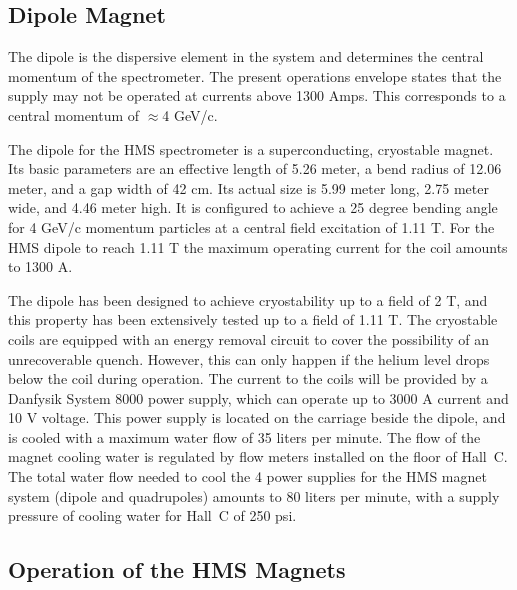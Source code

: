 {\vspace{0.5in}
\hspace*{3.5in}{\underline{~~~~~~~~~~~~~~~~~~~~~~~~~~~~~~~~~}}
\newline
\hspace*{3.5in}{Signature~~~~~~~~~~~~Date}

\newpage
\subsection{Dipole Magnet }

The dipole is the dispersive element in the system and 
determines the central momentum of the spectrometer.
The present operations envelope states that the supply may not be
operated at currents above 1300 Amps. This corresponds to a central
momentum of $\approx$4 GeV/c.

The dipole for the HMS spectrometer is a superconducting, cryostable magnet.
Its basic parameters are an effective length of 5.26 meter,
a bend radius of 12.06 meter, and a gap width of 42 cm.
Its actual size is 5.99 meter long, 2.75 meter wide, and 4.46 meter high.
It is configured to achieve a 25 degree bending angle for 4 GeV/c momentum
particles at a central field excitation of 1.11 T.
For the HMS dipole to reach 1.11 T the maximum operating current for the coil
amounts to 1300 A.

The dipole has been designed to achieve cryostability up to a field of 2 T,
and this property has been extensively tested up to a field of 1.11 T.
The cryostable coils are equipped with an energy removal circuit to cover
the possibility of an unrecoverable quench. \cite{bi:hms2}
However, this can only happen
if the helium level drops below the coil during operation.
The current to the coils will be provided by a Danfysik System 8000 power
supply, which can operate up to 3000 A current and 10 V voltage.
This power supply is located on the carriage beside the dipole, and
is cooled with a maximum water flow of 35 liters per minute.
The flow of the magnet cooling water is regulated by flow meters installed
on the floor of Hall~C. The total water flow needed to cool the 4 power
supplies for the HMS magnet system (dipole and quadrupoles) amounts
to 80 liters per minute, with a supply pressure of cooling water for
Hall~C of 250 psi.


\subsection{Operation of the HMS Magnets}

}

